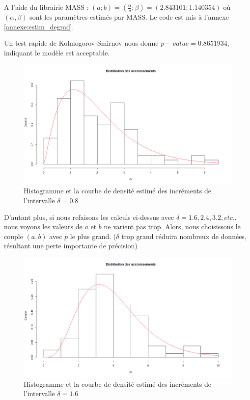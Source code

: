 \documentclass[10pt,a4paper]{article}
\begin{document}
A l'aide du librairie MASS : $\left( {a;b} \right) = \left( {\frac{\alpha }{\delta };\beta } \right) = \left( {2.843101;1.140354} \right)$ où $(\alpha, \beta)$ sont les paramètres estimés par MASS. Le code est mis à l'annexe \eqref{annexe:estim_degrad}.

Un test rapide de Kolmogorov-Smirnov nous donne $p-value = 0.8651934$, indiquant le modèle est acceptable.
\begin{figure}[!h]
    \centering
    \includegraphics[width=\textwidth]{img/histo_dens_degrad.png}
    \caption{Histogramme et la courbe de densité estimé des incréments de l'intervalle $\delta = 0.8$}
    \label{fig:histo_dens_degrad}
\end{figure}

D'autant plus, si nous refaisons les calculs ci-dessus avec $\delta = 1.6, 2.4, 3.2, etc.$, nous voyons les valeurs de $a$ et $b$ ne varient pas trop. Alors, nous choisissons le couple $(a,b)$ avec $p$ le plus grand. ($\delta$ trop grand réduira nombreux de données, résultant une perte importante de précision)

\begin{figure}[!h]
    \centering
    \includegraphics[width=\textwidth]{img/histo_dens_degrad_1_6.png}
    \caption{Histogramme et la courbe de densité estimé des incréments de l'intervalle $\delta = 1.6$}
    \label{fig:histo_dens_degrad_1_6}
\end{figure}
\end{document}

